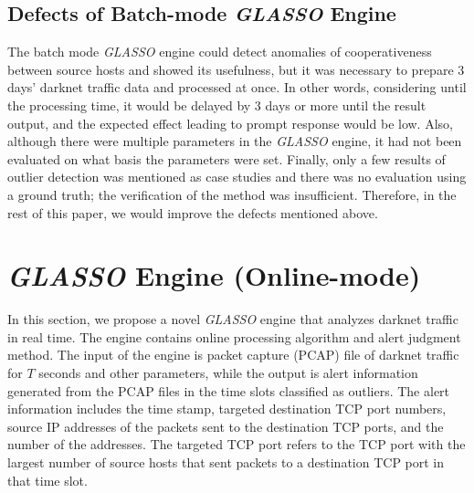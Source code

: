 \documentclass[conference]{IEEEtran}
\begin{document}
\subsection{Defects of Batch-mode {\it GLASSO} Engine}
The batch mode {\it GLASSO} engine could detect anomalies of cooperativeness between source hosts and showed its usefulness, but it was necessary to prepare 3 days' darknet traffic data and processed at once.
In other words, considering until the processing time, it would be delayed by 3 days or more until the result output, and the expected effect leading to prompt response would be low.
Also, although there were multiple parameters in the {\it GLASSO} engine, it had not been evaluated on what basis the parameters were set.
Finally, only a few results of outlier detection was mentioned as case studies and there was no evaluation using a ground truth; the verification of the method was insufficient.
Therefore, in the rest of this paper, we would improve the defects mentioned above.



\section{{\it GLASSO} Engine (Online-mode)}
In this section, we propose a novel {\it GLASSO} engine that analyzes darknet traffic in real time.
The engine contains online processing algorithm and alert judgment method.
The input of the engine is packet capture (PCAP) file of darknet traffic for $T$ seconds and other parameters, while the output is alert information generated from the PCAP files in the time slots classified as outliers.
The alert information includes the time stamp, targeted destination TCP port numbers, source IP addresses of the packets sent to the destination TCP ports, and the number of the addresses.
The targeted TCP port refers to the TCP port with the largest number of source hosts that sent packets to a destination TCP port in that time slot.


\end{document}
